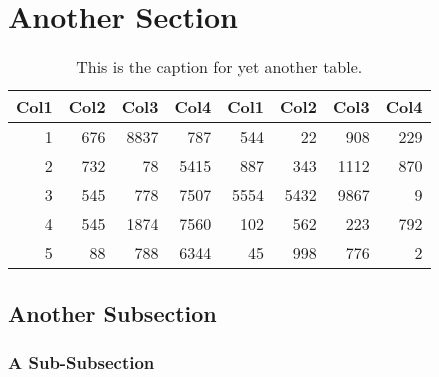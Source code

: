 \section{Another Section}
\lipsum[1-2]
\begin{table}
	\centering
	\begin{tabular}{r r r r r r r r}
		Col1 & Col2 & Col3 & Col4 & Col1 & Col2 & Col3 & Col4 \\
		\hline
		1    & 676  & 8837 & 787  & 544  & 22   & 908  & 229  \\
		2    & 732  & 78   & 5415 & 887  & 343  & 1112 & 870  \\
		3    & 545  & 778  & 7507 & 5554 & 5432 & 9867 & 9    \\
		4    & 545  & 1874 & 7560 & 102  & 562  & 223  & 792  \\
		5    & 88   & 788  & 6344 & 45   & 998  & 776  & 2    \\
		\hline
	\end{tabular}
	\caption{This is the caption for yet another table.}
\end{table}

\subsection{Another Subsection}
\lipsum[3-5]

\subsubsection{A Sub-Subsection}
\lipsum[6-8]
